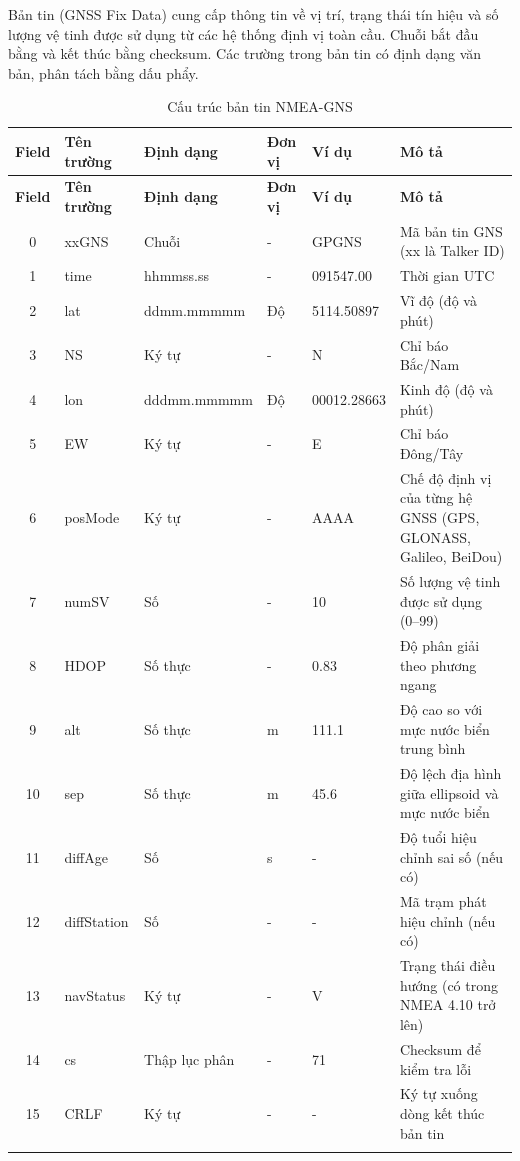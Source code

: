 \documentclass[../DoAn.tex]{subfiles}
\begin{document}
Bản tin  (GNSS Fix Data) cung cấp thông tin về vị trí, trạng thái tín hiệu và số lượng vệ tinh được sử dụng từ các hệ thống định vị toàn cầu. Chuỗi bắt đầu bằng  và kết thúc bằng checksum. Các trường trong bản tin có định dạng văn bản, phân tách bằng dấu phẩy.

\begin{longtable}{|c|l|l|l|l|p{4cm}|}
\hline
\textbf{Field} & \textbf{Tên trường} & \textbf{Định dạng} & \textbf{Đơn vị} & \textbf{Ví dụ} & \textbf{Mô tả} \\
\hline
\endfirsthead

\hline
\textbf{Field} & \textbf{Tên trường} & \textbf{Định dạng} & \textbf{Đơn vị} & \textbf{Ví dụ} & \textbf{Mô tả} \\
\hline
\endhead

\hline
\endfoot

\endlastfoot

0 & xxGNS & Chuỗi & - & GPGNS & Mã bản tin GNS (xx là Talker ID) \\ \hline
1 & time & hhmmss.ss & - & 091547.00 & Thời gian UTC \\ \hline
2 & lat & ddmm.mmmmm & Độ & 5114.50897 & Vĩ độ (độ và phút) \\ \hline
3 & NS & Ký tự & - & N & Chỉ báo Bắc/Nam \\ \hline
4 & lon & dddmm.mmmmm & Độ & 00012.28663 & Kinh độ (độ và phút) \\ \hline
5 & EW & Ký tự & - & E & Chỉ báo Đông/Tây \\ \hline
6 & posMode & Ký tự & - & AAAA & Chế độ định vị của từng hệ GNSS (GPS, GLONASS, Galileo, BeiDou) \\ \hline
7 & numSV & Số & - & 10 & Số lượng vệ tinh được sử dụng (0–99) \\ \hline
8 & HDOP & Số thực & - & 0.83 & Độ phân giải theo phương ngang \\ \hline
9 & alt & Số thực & m & 111.1 & Độ cao so với mực nước biển trung bình \\ \hline
10 & sep & Số thực & m & 45.6 & Độ lệch địa hình giữa ellipsoid và mực nước biển \\ \hline
11 & diffAge & Số & s & - & Độ tuổi hiệu chỉnh sai số (nếu có) \\ \hline
12 & diffStation & Số & - & - & Mã trạm phát hiệu chỉnh (nếu có) \\ \hline
13 & navStatus & Ký tự & - & V & Trạng thái điều hướng (có trong NMEA 4.10 trở lên) \\ \hline
14 & cs & Thập lục phân & - & 71 & Checksum để kiểm tra lỗi \\ \hline
15 & CRLF & Ký tự & - & - & Ký tự xuống dòng kết thúc bản tin \\ \hline

\caption{Cấu trúc bản tin NMEA-GNS} \\
\end{longtable}
\end{document}
